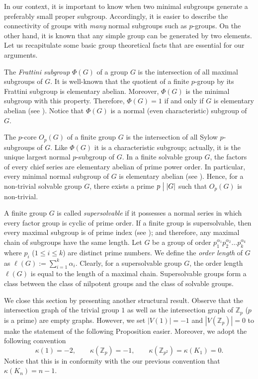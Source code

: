 \documentclass[a4paper,12pt]{article}
\theoremstyle{definition}
\theoremstyle{remark}
\theoremstyle{theorem}
\newcommand{\divides}{\bigm|}
\begin{document}
In our context, it is important to know when two minimal subgroups generate a preferably small proper subgroup. Accordingly, it is easier to describe the connectivity of groups with \emph{many} normal subgroups such as $p$-groups. On the other hand, it is known that any simple group can be generated by two elements. Let us recapitulate some basic group theoretical facts that are essential for our arguments.

The \emph{Frattini subgroup} $\Phi(G)$ of a group $G$ is the intersection of all maximal subgroups of $G$. It is well-known that the quotient of a finite $p$-group by its Frattini subgroup is elementary abelian. Moreover, $\Phi(G)$ is the minimal subgroup with this property. Therefore, $\Phi(G)=1$ if and only if $G$ is elementary abelian (see \cite[Theorem~5.1.3]{Gorenstein1980}). Notice that $\Phi(G)$ is a normal (even characteristic) subgroup of $G$. 

The $p$-core $O_p(G)$ of a finite group $G$ is the intersection of all Sylow $p$-subgroups of $G$. Like $\Phi(G)$ it is a characteristic subgroup; actually, it is the unique largest normal $p$-subgroup of $G$. In a finite solvable group $G$, the factors of every chief series are elementary abelian of prime power order. In particular, every minimal normal subgroup of $G$ is elementary abelian (see \cite[Theorem~2.4.2]{Gorenstein1980}). Hence, for a non-trivial solvable group $G$, there exists a prime $p\divides  |G|$ such that $O_p(G)$ is non-trivial.

A finite group $G$ is called \emph{supersolvable} if it possesses a normal series in which every factor group is cyclic of prime order. If a finite group is supersolvable, then every maximal subgroup is of prime index (see \cite[p.~85]{Isaacs2008}); and therefore, any maximal chain of subgroups have the same length. Let $G$ be a group of order $p_1^{\alpha_1}p_2^{\alpha_2}\dots p_k^{\alpha_k}$ where $p_i$ ($1\leq i\leq k$) are distinct prime numbers. We define the \emph{order length} of $G$ as $\ell(G):=\sum_{i=1}^k\alpha_i$. Clearly, for a supersolvable group $G$, the order length $\ell(G)$ is equal to the length of a maximal chain. Supersolvable groups form a class between the class of nilpotent groups and the class of solvable groups.

We close this section by presenting another structural result. Observe that the intersection graph of the trivial group $1$ as well as the intersection graph of $\mathbb{Z}_p$ ($p$ is a prime) are empty graphs. However, we set $|V(1)|=-1$ and $|V(\mathbb{Z}_p)|=0$ to make the statement of the following Proposition easier. Moreover, we adopt the following convention $$ \kappa(1)=-2,\qquad \kappa(\mathbb{Z}_p)=-1,\qquad \kappa(\mathbb{Z}_{p^2})=\kappa(K_1)=0. $$
Notice that this is in conformity with the our previous convention that $\kappa(K_n)=n-1$. 
\end{document}
